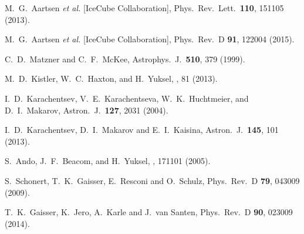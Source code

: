 \documentclass[aps,prd,nofootinbib,twocolumn,floatfix,letterpaper,superscriptaddress,showpacs]{revtex4}
\begin{document}
\begin{thebibliography}{99}
  M.~G.~Aartsen {\it et al.} [IceCube Collaboration],
  Phys.\ Rev.\ Lett.\  {\bf 110}, 151105 (2013).

  M.~G.~Aartsen {\it et al.} [IceCube Collaboration],
  Phys.\ Rev.\ D {\bf 91}, 122004 (2015).



  C.~D.~Matzner and C.~F.~McKee,
  Astrophys.\ J.\  {\bf 510}, 379 (1999).

  M.~D.\ Kistler, W.~C.\ Haxton, and H.\ Yuksel,
  , 81 (2013).







  I.~D.~Karachentsev, V.~E.\ Karachentseva, W.~K.~Huchtmeier, and D.~I.~Makarov,
  Astron.\ J.\  {\bf 127}, 2031 (2004).

  I.~D.~Karachentsev, D.~I.~Makarov and E.~I.~Kaisina,
  Astron.\ J.\  {\bf 145}, 101 (2013).



  S.\ Ando, J.~F.\ Beacom, and H.\ Yuksel,
  , 171101 (2005).



  S.~Schonert, T.~K.~Gaisser, E.~Resconi and O.~Schulz,
  Phys.\ Rev.\ D {\bf 79}, 043009 (2009).

  T.~K.~Gaisser, K.~Jero, A.~Karle and J.~van Santen,
  Phys.\ Rev.\ D {\bf 90}, 023009 (2014).



\end{thebibliography}
\end{document}
